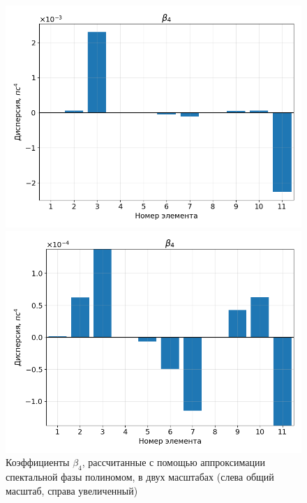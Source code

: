 \documentclass[12pt]{article}
\begin{document}
\begin{figure}[H]
    \centering
    \begin{minipage}[b]{0.5\textwidth}
        \includegraphics[width=\linewidth]{Images/Gauss Pulse without 15-19/Беты/beta_4_full}
    \end{minipage}%
    \begin{minipage}[b]{0.5\textwidth}
        \includegraphics[width=\linewidth]{Images/Gauss Pulse without 15-19/Беты/beta_4_cut}
    \end{minipage}

    \caption{Коэффициенты $\beta_4$, рассчитанные с помощью аппроксимации спектальной фазы полиномом,
     в двух масштабах (слева общий масштаб, справа увеличенный)}
    \label{fig:both}
\end{figure}
\end{document}
